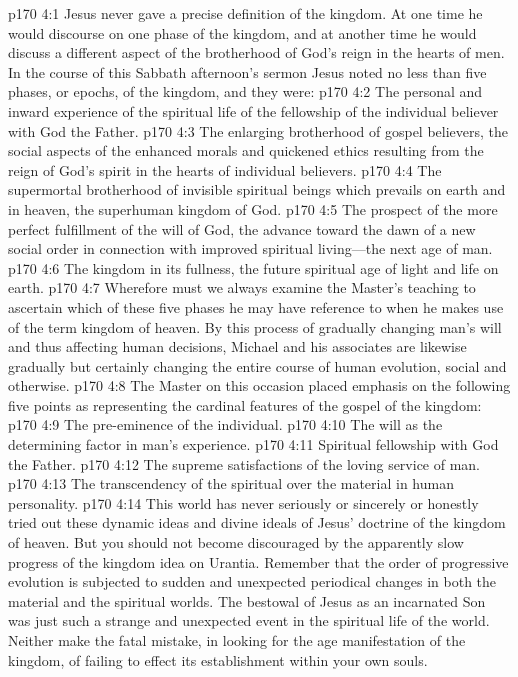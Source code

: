\vs p170 4:1 Jesus never gave a precise definition of the kingdom. At one time he would discourse on one phase of the kingdom, and at another time he would discuss a different aspect of the brotherhood of God’s reign in the hearts of men. In the course of this Sabbath afternoon’s sermon Jesus noted no less than five phases, or epochs, of the kingdom, and they were:
\pc \vs p170 4:2 \bibnobreakspace The personal and inward experience of the spiritual life of the fellowship of the individual believer with God the Father.
\pc \vs p170 4:3 \bibnobreakspace The enlarging brotherhood of gospel believers, the social aspects of the enhanced morals and quickened ethics resulting from the reign of God’s spirit in the hearts of individual believers.
\pc \vs p170 4:4 \bibnobreakspace The supermortal brotherhood of invisible spiritual beings which prevails on earth and in heaven, the superhuman kingdom of God.
\pc \vs p170 4:5 \bibnobreakspace The prospect of the more perfect fulfillment of the will of God, the advance toward the dawn of a new social order in connection with improved spiritual living---the next age of man.
\pc \vs p170 4:6 \bibnobreakspace The kingdom in its fullness, the future spiritual age of light and life on earth.
\pc \vs p170 4:7 Wherefore must we always examine the Master’s teaching to ascertain which of these five phases he may have reference to when he makes use of the term kingdom of heaven. By this process of gradually changing man’s will and thus affecting human decisions, Michael and his associates are likewise gradually but certainly changing the entire course of human evolution, social and otherwise.
\vs p170 4:8 The Master on this occasion placed emphasis on the following five points as representing the cardinal features of the gospel of the kingdom:
\pc \vs p170 4:9 \bibnobreakspace The pre\hyp{}eminence of the individual.
\vs p170 4:10 \bibnobreakspace The will as the determining factor in man’s experience.
\vs p170 4:11 \bibnobreakspace Spiritual fellowship with God the Father.
\vs p170 4:12 \bibnobreakspace The supreme satisfactions of the loving service of man.
\vs p170 4:13 \bibnobreakspace The transcendency of the spiritual over the material in human personality.
\pc \vs p170 4:14 This world has never seriously or sincerely or honestly tried out these dynamic ideas and divine ideals of Jesus’ doctrine of the kingdom of heaven. But you should not become discouraged by the apparently slow progress of the kingdom idea on Urantia. Remember that the order of progressive evolution is subjected to sudden and unexpected periodical changes in both the material and the spiritual worlds. The bestowal of Jesus as an incarnated Son was just such a strange and unexpected event in the spiritual life of the world. Neither make the fatal mistake, in looking for the age manifestation of the kingdom, of failing to effect its establishment within your own souls.
